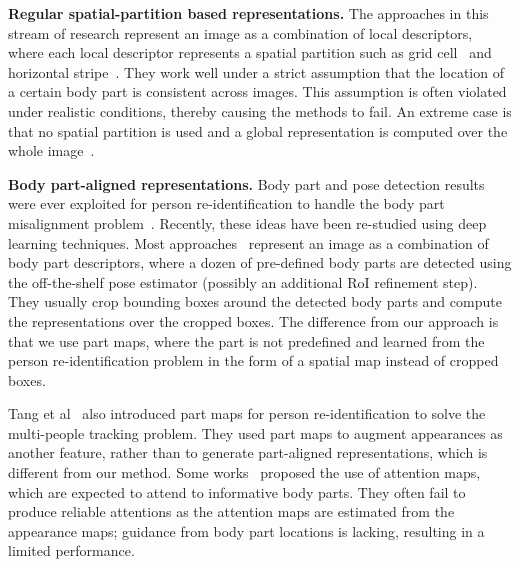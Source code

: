 \documentclass{llncs}
\begin{document}
\vspace{0.1cm}
\noindent\textbf{Regular spatial-partition based representations.}
The approaches in this stream of research represent an image as a combination of local descriptors, where each local descriptor represents a spatial partition such as grid cell~\cite{deepreid2014,improved2015,DCSL2016ijcai} and horizontal stripe~\cite{deepmetric2014,ChengGZWZ16,VariorSLXW16}. They work well under a strict assumption that the location of a certain body part is consistent across images. This assumption is often violated under realistic conditions, thereby causing the methods to fail. 
An extreme case is that no spatial partition is used and a global representation is computed over the whole image~\cite{PaisitkriangkraiSV15,XiaoLOW16,ZhengBSWSWT16,PersonNet2016,chen2016deep,xiaoli2016end}.

\vspace{0.1cm}
\noindent\textbf{Body part-aligned representations.}
Body part and pose detection results were ever exploited for person re-identification to handle the body part misalignment problem~\cite{ChengCSBM11,XuLZL13,BakCBT10a,Farenzena2010symmetry,WeinrichVG13,ChengC14}. Recently, these ideas have been re-studied using deep learning techniques. Most approaches~\cite{ZhengHLY17,SuLZXGT17,ZhaoTSSYYWT17} represent an image 
as a combination of body part descriptors, where a dozen of pre-defined body parts are detected using the off-the-shelf pose estimator (possibly an additional RoI refinement step). They usually crop bounding boxes around the detected body parts and compute the representations over the cropped boxes. The difference from our approach is that we use part maps, where the part is not predefined
and learned from the person re-identification problem in the form of a spatial map instead of cropped boxes.

Tang et al~\cite{TangAAS17} also introduced part maps for person re-identification to solve the multi-people tracking problem. They used part maps to augment appearances as another feature, rather than to generate part-aligned representations, which is different from our method. Some works~\cite{LiuZTSSYYW17,ZhaoLZW17} proposed the use of attention maps, which are expected to attend to informative body parts. They often fail to produce reliable attentions as the attention maps are estimated from the appearance maps; guidance from body part locations is lacking, resulting in a limited performance.
\end{document}
